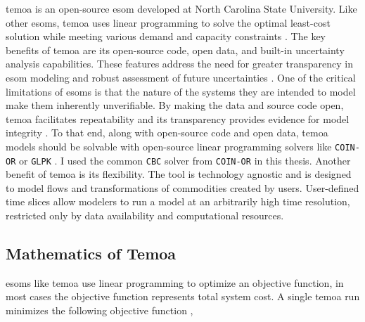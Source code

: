 \gls{temoa} is an open-source \gls{esom} developed at North Carolina State University.
Like other \glspl{esom}, \gls{temoa} uses linear programming to solve the optimal
least-cost solution while meeting various demand and capacity constraints \cite{hunter_modeling_2013}.
The key benefits of \gls{temoa} are its open-source code, open data, and built-in
uncertainty analysis capabilities. These features address the need for greater
transparency in \gls{esom} modeling and robust assessment of future uncertainties
\cite{hunter_modeling_2013}. One of the critical limitations of \glspl{esom} is that
the nature of the systems they are intended to model make them inherently
unverifiable. By making the data and source code open,
\gls{temoa} facilitates repeatability and its transparency provides evidence for
model integrity
\cite{decarolis_case_2012}. To that end, along with open-source code and open data,
\gls{temoa} models should be solvable
with open-source linear programming solvers like \texttt{COIN-OR} \cite{coin-or_foundation_coin-or_nodate} or \texttt{GLPK} \cite{free_software_foundation_glpk_nodate}. I used the common
\texttt{CBC} solver from \texttt{COIN-OR} \cite{forrest_cbc_2021} in this thesis.
Another benefit of \gls{temoa} is its flexibility.
The tool is technology agnostic and is designed to model flows and transformations
of commodities created by users.
User-defined time slices allow modelers to run a model at an arbitrarily high
time resolution, restricted only by data availability and computational resources.

\subsection{Mathematics of Temoa}
\glspl{esom} like \gls{temoa} use linear programming to optimize an objective
function, in most cases the objective function represents total system cost.
A single \gls{temoa} run minimizes the following objective function \cite{decarolis_preface_nodate},

